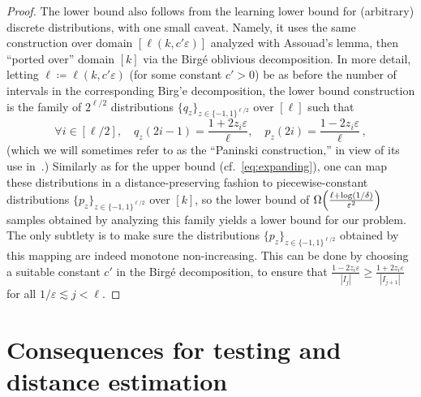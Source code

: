 \documentclass[11pt]{article}
\newcommand{\dst}{\varepsilon}
\newcommand{\ab}{k}
\renewcommand{\eqdef}{\coloneqq}
\newcommand{\p}{p}
\newcommand{\q}{q}
\begin{document}
\begin{proof}
The lower bound also follows from the learning lower bound for (arbitrary) discrete distributions, with one small caveat. Namely, it uses the same construction over domain $[\ell(\ab,c'\dst)]$ analyzed with Assouad's lemma, then ``ported over'' domain $[\ab]$ via the Birg\'e oblivious decomposition. In more detail, letting $\ell \eqdef \ell(\ab,c'\dst)$ (for some constant $c'>0$) be as before the number of intervals in the corresponding Birg'e decomposition, the lower bound construction is the family of $2^{\ell/2}$ distributions $\{\q_z\}_{z\in\{-1,1\}^{\ell/2}}$ over $[\ell]$ such that
\begin{equation}\label{eq:paninski}
    \forall i\in[\ell/2], \quad \q_z(2i-1) = \frac{1+2z_i \dst}{\ell}, \quad \p_z(2i)= \frac{1-2z_i \dst}{\ell}\,,
\end{equation}
(which we will sometimes refer to as the ``Paninski construction,'' in view of its use in~\cite{Paninski:08}.) Similarly as for the upper bound (cf.~\eqref{eq:expanding}), one can map these distributions in a distance-preserving fashion to piecewise-constant distributions $\{\p_z\}_{z\in\{-1,1\}^{\ell/2}}$ over $[\ab]$, so the lower bound of $\bigOmega{\frac{\ell+\log(1/\delta)}{\dst^2}}$ samples obtained by analyzing this family yields a lower bound for our problem. The only subtlety is to make sure the distributions $\{\p_z\}_{z\in\{-1,1\}^{\ell/2}}$ obtained by this mapping are indeed monotone non-increasing. This can be done by choosing a suitable constant $c'$ in the Birg\'e decomposition, to ensure that $\frac{1-2z_i\dst}{|I_j|} \geq \frac{1+2z_i\dst}{|I_{j+1}|}$ for all $1/\dst\lesssim j<\ell$.
\end{proof} 


\section{Consequences for testing and distance estimation}
\end{document}

